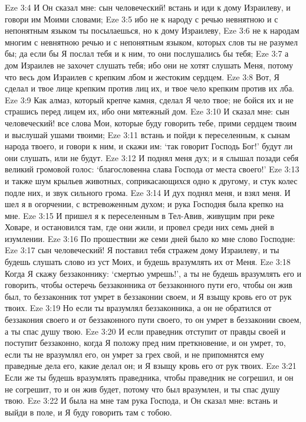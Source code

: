 Eze 3:4  И Он сказал мне: сын человеческий! встань и иди к дому Израилеву, и говори им Моими словами;
Eze 3:5  ибо не к народу с речью невнятною и с непонятным языком ты посылаешься, но к дому Израилеву,
Eze 3:6  не к народам многим с невнятною речью и с непонятным языком, которых слов ты не разумел бы; да если бы Я послал тебя и к ним, то они послушались бы тебя;
Eze 3:7  а дом Израилев не захочет слушать тебя; ибо они не хотят слушать Меня, потому что весь дом Израилев с крепким лбом и жестоким сердцем.
Eze 3:8  Вот, Я сделал и твое лице крепким против лиц их, и твое чело крепким против их лба.
Eze 3:9  Как алмаз, который крепче камня, сделал Я чело твое; не бойся их и не страшись перед лицем их, ибо они мятежный дом.
Eze 3:10  И сказал мне: сын человеческий! все слова Мои, которые буду говорить тебе, прими сердцем твоим и выслушай ушами твоими;
Eze 3:11  встань и пойди к переселенным, к сынам народа твоего, и говори к ним, и скажи им: `так говорит Господь Бог!' будут ли они слушать, или не будут.
Eze 3:12  И поднял меня дух; и я слышал позади себя великий громовой голос: `благословенна слава Господа от места своего!'
Eze 3:13  и также шум крыльев животных, соприкасающихся одно к другому, и стук колес подле них, и звук сильного грома.
Eze 3:14  И дух поднял меня, и взял меня. И шел я в огорчении, с встревоженным духом; и рука Господня была крепко на мне.
Eze 3:15  И пришел я к переселенным в Тел-Авив, живущим при реке Ховаре, и остановился там, где они жили, и провел среди них семь дней в изумлении.
Eze 3:16  По прошествии же семи дней было ко мне слово Господне:
Eze 3:17  сын человеческий! Я поставил тебя стражем дому Израилеву, и ты будешь слушать слово из уст Моих, и будешь вразумлять их от Меня.
Eze 3:18  Когда Я скажу беззаконнику: `смертью умрешь!', а ты не будешь вразумлять его и говорить, чтобы остеречь беззаконника от беззаконного пути его, чтобы он жив был, то беззаконник тот умрет в беззаконии своем, и Я взыщу кровь его от рук твоих.
Eze 3:19  Но если ты вразумлял беззаконника, а он не обратился от беззакония своего и от беззаконного пути своего, то он умрет в беззаконии своем, а ты спас душу твою.
Eze 3:20  И если праведник отступит от правды своей и поступит беззаконно, когда Я положу пред ним преткновение, и он умрет, то, если ты не вразумлял его, он умрет за грех свой, и не припомнятся ему праведные дела его, какие делал он; и Я взыщу кровь его от рук твоих.
Eze 3:21  Если же ты будешь вразумлять праведника, чтобы праведник не согрешил, и он не согрешит, то и он жив будет, потому что был вразумлен, и ты спас душу твою.
Eze 3:22  И была на мне там рука Господа, и Он сказал мне: встань и выйди в поле, и Я буду говорить там с тобою.
